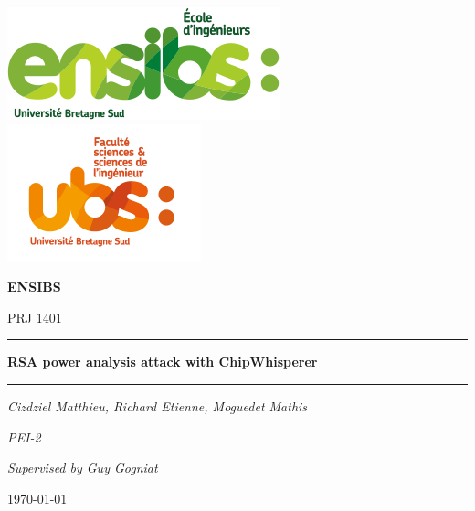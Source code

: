 \documentclass[a4paper,12pt]{article}
\begin{document}
\begin{titlepage}
  \vspace*{-2cm}
  \hspace*{-2cm}\includegraphics[scale=0.6]{logo.png}
  \vspace*{-2cm}
  \hspace*{7cm}\includegraphics[scale=0.6]{logo2.png}\par
  \vspace{4cm}
  \centering
  {\scshape\LARGE \textbf{ENSIBS} \par}

  \vspace{1cm}
  {\scshape\Large PRJ 1401 \par}
  \vspace{1cm}
  \rule{\linewidth}{0.4mm}\par %
  \vspace{1cm}
  {\huge\bfseries RSA power analysis attack with ChipWhisperer \par}
  \vspace{1cm}
  \rule{\linewidth}{0.4mm}\par %
  \par
  \vspace{1cm}
  {\Large\itshape Cizdziel Matthieu, Richard Etienne, Moguedet Mathis\par}
  \vspace{1cm}
  {\Large\itshape PEI-2\par}
  \vspace{3cm}
  \par
  {\Large\itshape Supervised by Guy Gogniat\par}
  \vfill
  {\large \today\par}
\end{titlepage}
\end{document}
